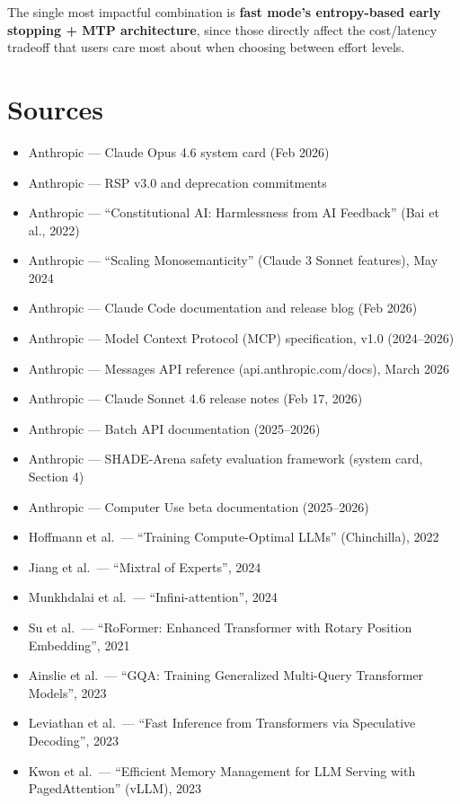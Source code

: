 \documentclass[11pt,a4paper]{article}
\begin{document}
The single most impactful combination is \textbf{fast mode's entropy-based early stopping + MTP architecture}, since those directly affect the cost/latency tradeoff that users care most about when choosing between effort levels.

\section{Sources}

\begin{itemize}
  \item Anthropic --- Claude Opus 4.6 system card (Feb 2026)
  \item Anthropic --- RSP v3.0 and deprecation commitments
  \item Anthropic --- ``Constitutional AI: Harmlessness from AI Feedback'' (Bai et al., 2022)
  \item Anthropic --- ``Scaling Monosemanticity'' (Claude 3 Sonnet features), May 2024
  \item Anthropic --- Claude Code documentation and release blog (Feb 2026)
  \item Anthropic --- Model Context Protocol (MCP) specification, v1.0 (2024--2026)
  \item Anthropic --- Messages API reference (api.anthropic.com/docs), March 2026
  \item Anthropic --- Claude Sonnet 4.6 release notes (Feb 17, 2026)
  \item Anthropic --- Batch API documentation (2025--2026)
  \item Anthropic --- SHADE-Arena safety evaluation framework (system card, Section 4)
  \item Anthropic --- Computer Use beta documentation (2025--2026)
  \item Hoffmann et al.\ --- ``Training Compute-Optimal LLMs'' (Chinchilla), 2022
  \item Jiang et al.\ --- ``Mixtral of Experts'', 2024
  \item Munkhdalai et al.\ --- ``Infini-attention'', 2024
  \item Su et al.\ --- ``RoFormer: Enhanced Transformer with Rotary Position Embedding'', 2021
  \item Ainslie et al.\ --- ``GQA: Training Generalized Multi-Query Transformer Models'', 2023
  \item Leviathan et al.\ --- ``Fast Inference from Transformers via Speculative Decoding'', 2023
  \item Kwon et al.\ --- ``Efficient Memory Management for LLM Serving with PagedAttention'' (vLLM), 2023

\end{itemize}
\end{document}

